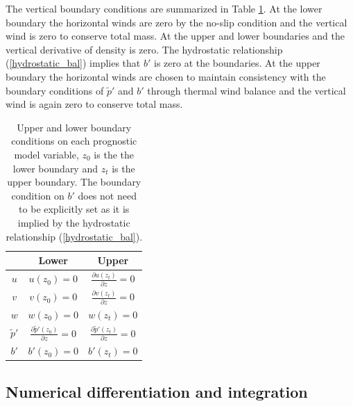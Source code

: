 \documentclass[times]{qjrms4}
\begin{document}
The vertical boundary conditions are summarized in Table \ref{vbcs}.
At the lower boundary the horizontal winds are zero by the no-slip condition and the vertical wind 
is zero to conserve total mass.
At the upper and lower boundaries and the vertical derivative of density is zero.  
The hydrostatic relationship (\ref{hydrostatic_bal}) implies that $b'$ is zero at the boundaries.
At the upper boundary the horizontal winds are chosen to maintain consistency with the boundary 
conditions of $\tilde{p}'$ and $b'$ through thermal wind balance and the vertical wind is again 
zero to conserve total mass.
%
\begin{table}[ht!]
 \begin{center}
 \setlength{\extrarowheight}{0.2cm}

  \begin{tabular}{|c|c|c|}%
    \hline
           & Lower   & Upper \\ \hline
    $ u $  & $u(z_0) = 0$                                  & $\frac{\partial u(z_t)}{\partial z} = 0 $    \\[1.05ex]\hline
    $ v $  & $v(z_0) = 0$                                  & $\frac{\partial v(z_t)}{\partial z} = 0 $    \\[1.05ex]\hline
    $ w $  & $w(z_0) = 0$                                  & $w(z_t)=0 $      \\[1.05ex] \hline
   $\tilde{p}'$ & $\frac{\partial \tilde{p}'(z_0)}{\partial z} = 0 $ & $\frac{\partial \tilde{p}'(z_t)}{\partial z} = 0 $    \\[1.05ex] \hline
   $ b' $  & $b'(z_0) = 0$                                 & $b'(z_t) = 0$    \\[1.05ex]
    \hline
  \end{tabular}
 \caption{Upper and lower boundary conditions on each prognostic model variable, $z_0$ is the the lower boundary and $z_t$ is the upper boundary. The boundary condition on $b'$ does not need to be explicitly set as it is implied by the hydrostatic relationship
 (\ref{hydrostatic_bal}). }
 \label{vbcs}
 \end{center}
\end{table}

\subsection{Numerical differentiation and integration}
\end{document}
